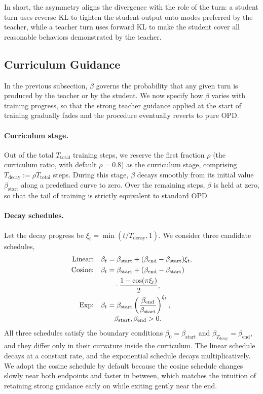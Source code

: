 \documentclass[11pt]{article}
\begin{document}
In short, the asymmetry aligns the divergence with the role of the turn: a student turn uses reverse KL to tighten the student output onto modes preferred by the teacher, while a teacher turn uses forward KL to make the student cover all reasonable behaviors demonstrated by the teacher.

\subsection{Curriculum Guidance}
\label{sec:method:curriculum}

In the previous subsection, $\beta$ governs the probability that any given turn is produced by the teacher or by the student. We now specify how $\beta$ varies with training progress, so that the strong teacher guidance applied at the start of training gradually fades and the procedure eventually reverts to pure OPD.

\paragraph{Curriculum stage.}
Out of the total $T_{\text{total}}$ training steps, we reserve the first fraction $\rho$ (the curriculum ratio, with default $\rho = 0.8$) as the curriculum stage, comprising $T_{\text{decay}} := \rho T_{\text{total}}$ steps. During this stage, $\beta$ decays smoothly from its initial value $\beta_{\text{start}}$ along a predefined curve to zero. Over the remaining steps, $\beta$ is held at zero, so that the tail of training is strictly equivalent to standard OPD.

\paragraph{Decay schedules.}
Let the decay progress be $\xi_t = \min(t / T_{\text{decay}}, 1)$. We consider three candidate schedules,
\begin{align}
\text{Linear:}\quad
\beta_t
&= \beta_{\mathrm{start}}
 + (\beta_{\mathrm{end}} - \beta_{\mathrm{start}})\xi_t,
\label{eq:beta-linear}\\
\text{Cosine:}\quad
\beta_t
&= \beta_{\mathrm{start}}
 + (\beta_{\mathrm{end}} - \beta_{\mathrm{start}}) \notag\\
&\quad {}\cdot
\frac{1 - \cos(\pi \xi_t)}{2},
\label{eq:beta-cosine}\\
\text{Exp:}\quad
\beta_t
&= \beta_{\mathrm{start}}
\left(
\frac{\beta_{\mathrm{end}}}{\beta_{\mathrm{start}}}
\right)^{\xi_t},
\label{eq:beta-exp}\\[-0.3em]
&\quad \beta_{\mathrm{start}}, \beta_{\mathrm{end}} > 0.
\nonumber
\end{align}
All three schedules satisfy the boundary conditions $\beta_0 = \beta_{\text{start}}$ and $\beta_{T_{\text{decay}}} = \beta_{\text{end}}$, and they differ only in their curvature inside the curriculum. 
The linear schedule decays at a constant rate, and the exponential schedule decays multiplicatively. 
We adopt the cosine schedule by default because the cosine schedule changes slowly near both endpoints and faster in between, which matches the intuition of retaining strong guidance early on while exiting gently near the end.
\end{document}
